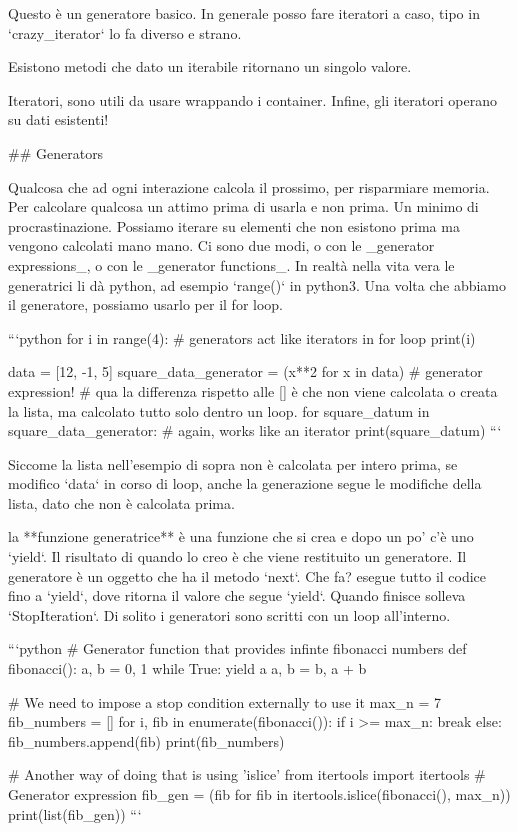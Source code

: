 \documentclass[10pt, a4paper, twosided, titlepage, draft]{book}
\begin{document}
Questo è un generatore basico. In generale posso fare iteratori a caso, tipo in `crazy_iterator` lo fa diverso e strano.

Esistono metodi che dato un iterabile ritornano un singolo valore.

Iteratori, sono utili da usare wrappando i container.
Infine, gli iteratori operano su dati esistenti!

## Generators

Qualcosa che ad ogni interazione calcola il prossimo, per risparmiare memoria. Per calcolare qualcosa un attimo prima di usarla e non prima. 
Un minimo di procrastinazione.
Possiamo iterare su elementi che non esistono prima ma vengono calcolati mano mano. 
Ci sono due modi, o con le _generator expressions_, o con le _generator functions_. In realtà nella vita vera le generatrici li dà python, ad esempio `range()` in python3.
Una volta che abbiamo il generatore, possiamo usarlo per il for loop.

```python
for i in range(4): # generators act like iterators in for loop
print(i)

data = [12, -1, 5]
square_data_generator = (x**2 for x in data) # generator expression!
# qua la differenza rispetto alle [] è che non viene calcolata o creata la lista, ma calcolato tutto solo dentro un loop.
for square_datum in square_data_generator: # again, works like an iterator
print(square_datum)
```

Siccome la lista nell'esempio di sopra non è calcolata per intero prima, se modifico `data` in corso di loop, anche la generazione segue le modifiche della lista, dato che non è calcolata prima.

la **funzione generatrice** è una funzione che si crea e dopo un po' c'è uno `yield`. Il risultato di quando lo creo è che viene restituito un generatore. 
Il generatore è un oggetto che ha il metodo `next`. Che fa? esegue tutto il codice fino a `yield`, dove ritorna il valore che segue `yield`. Quando finisce solleva `StopIteration`.
Di solito i generatori sono scritti con un loop all'interno.

```python
# Generator function that provides infinte fibonacci numbers
def fibonacci():
a, b = 0, 1
while True:
yield a
a, b = b, a + b

# We need to impose a stop condition externally to use it
max_n = 7
fib_numbers = []
for i, fib in enumerate(fibonacci()):
if i >= max_n:
break
else:
fib_numbers.append(fib)
print(fib_numbers)

# Another way of doing that is using ’islice’ from itertools
import itertools
# Generator expression
fib_gen = (fib for fib in itertools.islice(fibonacci(), max_n))
print(list(fib_gen))
```
\end{document}
